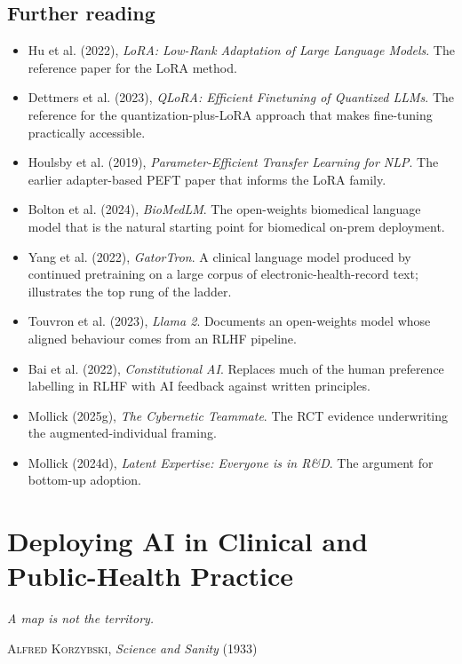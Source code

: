 \documentclass[
  letterpaper,
  11pt]{scrbook}
\providecommand{\tightlist}{%
  \setlength{\itemsep}{0pt}\setlength{\parskip}{0pt}}
\begin{document}
\section{Further reading}\label{further-reading-12}

\begin{itemize}
\tightlist
\item
  Hu et al. (2022), \emph{LoRA: Low-Rank Adaptation of Large Language
  Models}. The reference paper for the LoRA method.
\item
  Dettmers et al. (2023), \emph{QLoRA: Efficient Finetuning of Quantized
  LLMs}. The reference for the quantization-plus-LoRA approach that
  makes fine-tuning practically accessible.
\item
  Houlsby et al. (2019), \emph{Parameter-Efficient Transfer Learning for
  NLP}. The earlier adapter-based PEFT paper that informs the LoRA
  family.
\item
  Bolton et al. (2024), \emph{BioMedLM}. The open-weights biomedical
  language model that is the natural starting point for biomedical
  on-prem deployment.
\item
  {Yang et al.} (2022), \emph{GatorTron}. A clinical language model
  produced by continued pretraining on a large corpus of
  electronic-health-record text; illustrates the top rung of the ladder.
\item
  {Touvron et al.} (2023), \emph{Llama 2}. Documents an open-weights
  model whose aligned behaviour comes from an RLHF pipeline.
\item
  {Bai et al.} (2022), \emph{Constitutional AI}. Replaces much of the
  human preference labelling in RLHF with AI feedback against written
  principles.
\item
  Mollick (2025g), \emph{The Cybernetic Teammate}. The RCT evidence
  underwriting the augmented-individual framing.
\item
  Mollick (2024d), \emph{Latent Expertise: Everyone is in R\&D}. The
  argument for bottom-up adoption.
\end{itemize}

\chapter{Deploying AI in Clinical and Public-Health
Practice}\label{sec-deployment}

\begin{flushright}\small

\emph{A map is not the territory.}

\textsc{Alfred Korzybski}, \emph{Science and Sanity} (1933)

\end{flushright}
\end{document}
